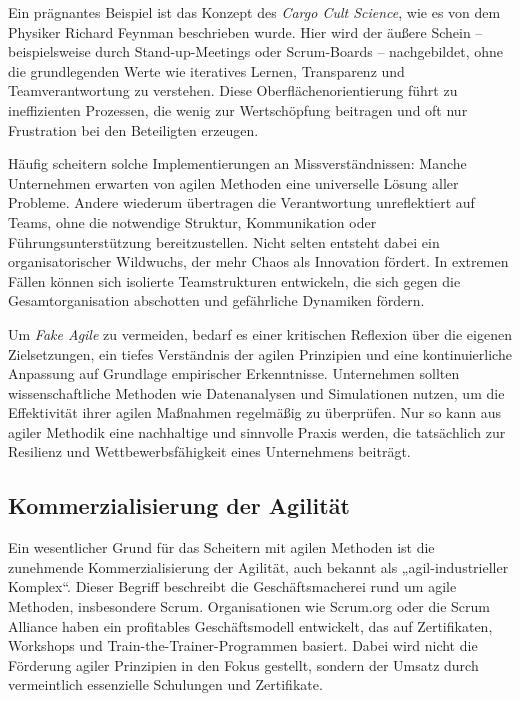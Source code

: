 \documentclass[ngerman]{seminarvorlage}
\begin{document}
Ein prägnantes Beispiel ist das Konzept des \textit{Cargo Cult Science}, wie es von dem Physiker Richard Feynman beschrieben wurde. Hier wird der äußere Schein – beispielsweise durch Stand-up-Meetings oder Scrum-Boards – nachgebildet, ohne die grundlegenden Werte wie iteratives Lernen, Transparenz und Teamverantwortung zu verstehen. Diese Oberflächenorientierung führt zu ineffizienten Prozessen, die wenig zur Wertschöpfung beitragen und oft nur Frustration bei den Beteiligten erzeugen.

Häufig scheitern solche Implementierungen an Missverständnissen: Manche Unternehmen erwarten von agilen Methoden eine universelle Lösung aller Probleme. Andere wiederum übertragen die Verantwortung unreflektiert auf Teams, ohne die notwendige Struktur, Kommunikation oder Führungsunterstützung bereitzustellen. Nicht selten entsteht dabei ein organisatorischer Wildwuchs, der mehr Chaos als Innovation fördert. In extremen Fällen können sich isolierte Teamstrukturen entwickeln, die sich gegen die Gesamtorganisation abschotten und gefährliche Dynamiken fördern.

Um \textit{Fake Agile} zu vermeiden, bedarf es einer kritischen Reflexion über die eigenen Zielsetzungen, ein tiefes Verständnis der agilen Prinzipien und eine kontinuierliche Anpassung auf Grundlage empirischer Erkenntnisse. Unternehmen sollten wissenschaftliche Methoden wie Datenanalysen und Simulationen nutzen, um die Effektivität ihrer agilen Maßnahmen regelmäßig zu überprüfen. Nur so kann aus agiler Methodik eine nachhaltige und sinnvolle Praxis werden, die tatsächlich zur Resilienz und Wettbewerbsfähigkeit eines Unternehmens beiträgt.
\cite{Mucke.2024}

\subsection{Kommerzialisierung der Agilität}

Ein wesentlicher Grund für das Scheitern mit agilen Methoden ist die zunehmende Kommerzialisierung der Agilität, auch bekannt als „agil-industrieller Komplex“. Dieser Begriff beschreibt die Geschäftsmacherei rund um agile Methoden, insbesondere Scrum. Organisationen wie Scrum.org oder die Scrum Alliance haben ein profitables Geschäftsmodell entwickelt, das auf Zertifikaten, Workshops und Train-the-Trainer-Programmen basiert. Dabei wird nicht die Förderung agiler Prinzipien in den Fokus gestellt, sondern der Umsatz durch vermeintlich essenzielle Schulungen und Zertifikate.
\end{document}
